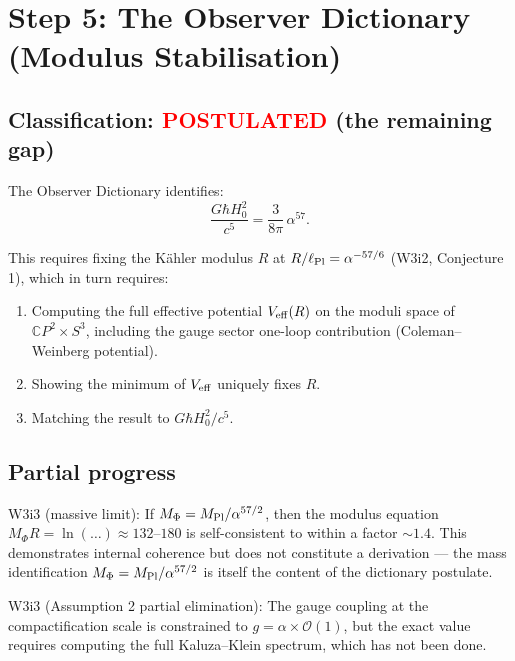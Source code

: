 \documentclass[11pt,a4paper]{article}
\newcommand{\CP}{\mathbb{C}P}
\newcommand{\Mpl}{M_{\rm Pl}}
\newcommand{\Hzero}{H_0}
\newcommand{\alphafine}{\alpha}
\newcommand{\order}[1]{\mathcal{O}(#1)}
\begin{document}
\section{Step 5: The Observer Dictionary (Modulus Stabilisation)}
\label{sec:step5}

\subsection{Classification: \textcolor{red}{POSTULATED} (the remaining gap)}

The Observer Dictionary identifies:
\begin{equation}
\frac{G\hbar\Hzero^2}{c^5} = \frac{3}{8\pi}\,\alphafine^{57}.
\end{equation}

This requires fixing the K\"ahler modulus $R$ at
$R/\ell_{\rm Pl} = \alphafine^{-57/6}$ (W3i2, Conjecture 1), which in
turn requires:
\begin{enumerate}[label=(\alph*)]
\item Computing the full effective potential $V_{\rm eff}(R)$ on the
  moduli space of $\CP^2 \times S^3$, including the gauge sector
  one-loop contribution (Coleman--Weinberg potential).
\item Showing the minimum of $V_{\rm eff}$ uniquely fixes $R$.
\item Matching the result to $G\hbar\Hzero^2/c^5$.
\end{enumerate}

\subsection{Partial progress}

W3i3 (massive limit): If $M_\Phi = \Mpl/\alphafine^{57/2}$, then
the modulus equation $M_\Phi R = \ln(\ldots) \approx 132$--$180$ is
self-consistent to within a factor $\sim 1.4$. This demonstrates
internal coherence but does not constitute a derivation --- the mass
identification $M_\Phi = \Mpl/\alphafine^{57/2}$ is itself the content
of the dictionary postulate.

W3i3 (Assumption 2 partial elimination): The gauge coupling at the
compactification scale is constrained to
$g = \alphafine \times \order{1}$, but the exact value requires
computing the full Kaluza--Klein spectrum, which has not been done.
\end{document}
